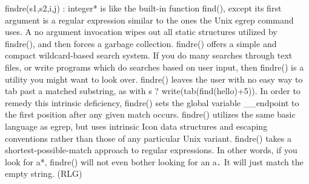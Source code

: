\textsf{findre(s1,s2,i,j) : integer*} is like the built-in function
\textsf{find()}, except its first argument is a regular expression similar to the ones the Unix
egrep command uses. A no argument invocation wipes out all
static structures utilized by \textsf{findre()}, and
then forces a garbage collection.
\textsf{findre()} offers a simple and compact wildcard-based search
system. If you do many searches through text files, or write programs
which do searches based on user input, then \textsf{findre()} is a
utility you might want to look over. \textsf{findre()} leaves the user
with no easy way to tab past a matched substring, as with \textsf{s ?
write(tab(find({\textquotedbl}hello{\textquotedbl})+5))}. In order to
remedy this intrinsic deficiency, \textsf{findre()} sets the global
variable \textsf{\_\_endpoint} to the first position after any given
match occurs. \textsf{findre()} utilizes the same basic language as
egrep, but uses intrinsic Icon data structures and escaping conventions
rather than those of any particular Unix variant. \textsf{findre()}
takes a shortest-possible-match approach to regular expressions. In
other words, if you look for \textsf{{\textquotedbl}a*{\textquotedbl}},
\textsf{findre()} will not even bother looking for an
\textsf{{\textquotedbl}a{\textquotedbl}}\texttt{.} It will just match
the empty string. (RLG)

